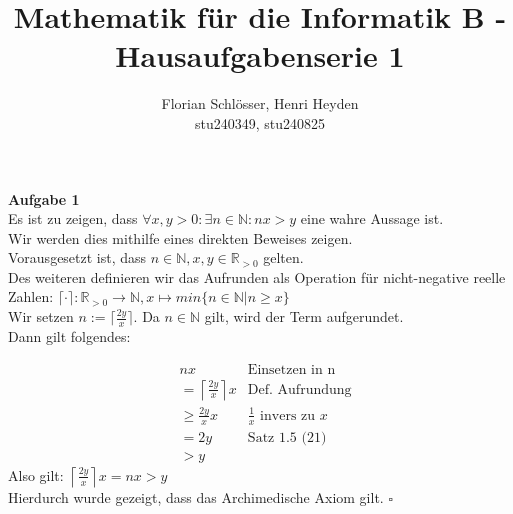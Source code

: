 \documentclass[12pt, a4paper]{article}
\title{Mathematik für die Informatik B - Hausaufgabenserie 1}
\author{Florian Schlösser, Henri Heyden \\ \small stu240349, stu240825}
\date{}
\newcommand*{\qed}{\null\nobreak\hfill\ensuremath{\square}}
\begin{document}
\maketitle

\doublespacing
\textbf{Aufgabe 1} \\
Es ist zu zeigen, dass $ \forall x,y > 0: \exists n \in \mathbb N: nx > y$ eine wahre Aussage ist. \\
Wir werden dies mithilfe eines direkten Beweises zeigen. \\
Vorausgesetzt ist, dass $n \in \mathbb N, x,y\in \mathbb R_{>0}$ gelten.\\
Des weiteren definieren wir das Aufrunden als Operation für nicht-negative reelle Zahlen: $\lceil \cdot \rceil : \mathbb R_{>0} \rightarrow \mathbb N, x \mapsto min\{n \in \mathbb N | n \ge x\}  $\\
Wir setzen $n := \lceil\frac{2y}{x}\rceil$. Da $n \in \mathbb N$ gilt, wird der Term aufgerundet.\\
Dann gilt folgendes:

\vspace{-1cm}
\begin{align*}
	& nx & \text{Einsetzen in n}\\
	& = \left\lceil \frac{2y}{x} \right\rceil x & \text{Def. Aufrundung}\\
	& \ge \frac{2y}{x}x &\text{$\frac 1 x$ invers zu $x$} \\
	& = 2y & \text{Satz 1.5 (21)}\\
	& > y
\end{align*}
\hspace{-0.15cm}
Also gilt: $\left\lceil \frac{2y}{x} \right\rceil x = nx > y$ \\
Hierdurch wurde gezeigt, dass das Archimedische Axiom gilt. \qed 
\end{document}
